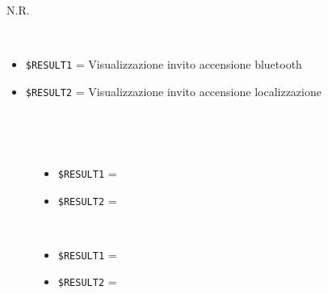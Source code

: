 \documentclass[../../SperimentazioniPratiche.tex]{subfiles}
\begin{document}
	
	\newpage	
			\paragraph*{}	
			\label{2Prova8A.1}
			\begin{tcolorbox}[fonttitle=\bfseries, 
								adjusted title={\Large Prova 8A.1}, 
								breakable, 
								sharp corners=south,
								colback=white, 
								colframe=white!60!black]
								
				\begin{description}[leftmargin=0.7cm,labelwidth=!]
				
					\item[Input] \ \par 
        				N.R.
        				
        			\tcbline 
        				
        			\item[Output atteso] \ \par
        				\begin{itemize}
        					\item \verb|$RESULT1| = Visualizzazione invito accensione bluetooth
        					\item \verb|$RESULT2| = Visualizzazione invito accensione localizzazione
        				\end{itemize}

					\tcbline        				
        				
        			\item[Output riscontrato] \ \par
        				\begin{description}
        				
        					\item[\dispositivoA] \ \par
        					\begin{itemize}
        						\item \verb|$RESULT1| = \ok
        						\item \verb|$RESULT2| = \ok
        					\end{itemize}      					
        					
        					\item[\dispositivoB] \ \par
        					\begin{itemize}
        						\item \verb|$RESULT1| = \ok
        						\item \verb|$RESULT2| = \ok
        					\end{itemize}
        					

\end{description}
\end{description}
\end{tcolorbox}
\end{document}
